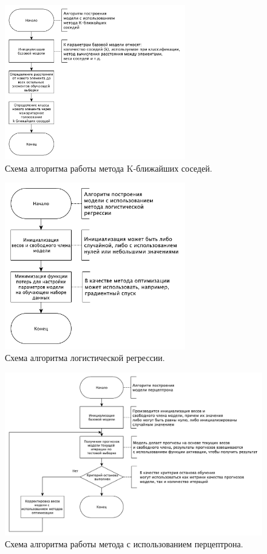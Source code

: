 \begin{figure}[H]
	\centering
	\includegraphics[width=0.7\textwidth]{inc/schemeKnn.pdf}
	\caption{ Схема алгоритма работы метода K-ближайших соседей. }
	\label{img:schemeKnn}
\end{figure}

\begin{figure}[H]
	\centering
	\includegraphics[width=0.7\textwidth]{inc/schemeLogistic.pdf}
	\caption{ Схема алгоритма логистической регрессии. }
	\label{img:schemeLogistic}
\end{figure}

\begin{figure}[H]
	\centering
	\includegraphics[width=\textwidth]{inc/schemePerceptrone.pdf}
	\caption{ Схема алгоритма работы метода с использованием перцептрона. }
	\label{img:schemePerceptrone}
\end{figure}

